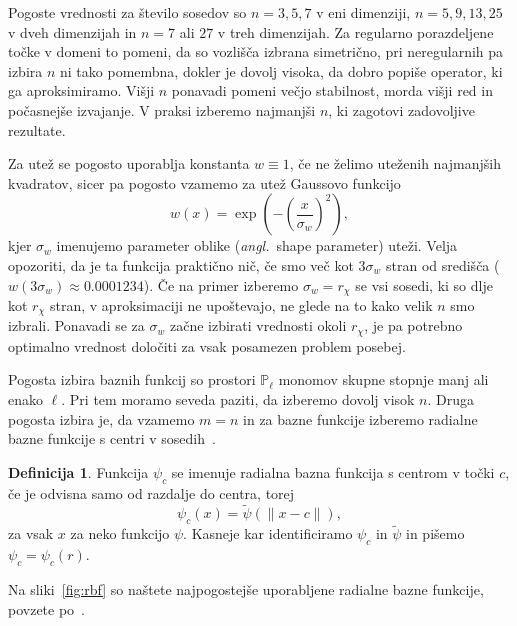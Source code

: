 \documentclass[12pt,a4paper,twoside]{article}
\theoremstyle{definition} %
\newtheorem{definicija}{Definicija}[section]
\theoremstyle{plain} %
\numberwithin{equation}{section}
\newcommand{\ang}[1]{(\textit{angl.}\ #1)}
\begin{document}
Pogoste vrednosti za število sosedov so $n = 3, 5, 7$ v eni dimenziji, $n = 5, 9, 13, 25$ v dveh
dimenzijah in $n = 7$ ali $27$ v treh dimenzijah. Za regularno porazdeljene točke v domeni to
pomeni, da so vozlišča izbrana simetrično, pri neregularnih pa izbira $n$ ni tako pomembna, dokler
je dovolj visoka, da dobro popiše operator, ki ga aproksimiramo.  Višji $n$ ponavadi pomeni večjo
stabilnost, morda višji red in počasnejše izvajanje. V praksi izberemo najmanjši $n$, ki zagotovi
zadovoljive rezultate.

Za utež se pogosto uporablja konstanta $w\equiv1$, če ne želimo uteženih
najmanjših kvadratov, sicer pa pogosto vzamemo za utež Gaussovo funkcijo
\begin{equation}
   w(x) = \exp\left(-\left(\frac{x}{\sigma_w}\right)^2 \right),
\end{equation}
kjer $\sigma_w$ imenujemo parameter oblike \ang{shape parameter} uteži.
Velja opozoriti, da je ta funkcija praktično nič, če smo več kot $3\sigma_w$
stran od središča ($w(3\sigma_w) \approx 0.0001234$). Če na primer izberemo
$\sigma_w = r_\chi$ se vsi sosedi, ki so dlje kot $r_\chi$ stran, v
aproksimaciji ne upoštevajo, ne glede na to kako velik $n$ smo izbrali.
Ponavadi se za $\sigma_w$ začne izbirati vrednosti okoli $r_\chi$, je
pa potrebno optimalno vrednost določiti za vsak posamezen problem posebej.

Pogosta izbira baznih funkcij so prostori $\mathbb{P}_\ell$ monomov skupne
stopnje manj ali enako $\ell$. Pri tem moramo seveda paziti, da izberemo dovolj
visok $n$. Druga pogosta izbira je, da vzamemo $m = n$ in za bazne funkcije
izberemo radialne bazne funkcije s centri v sosedih~\cite{kosec2011h}.

\begin{definicija}
  Funkcija $\psi_c$ se imenuje radialna bazna funkcija s centrom v točki
  $c$,
  če je odvisna samo od razdalje do centra, torej \[
    \psi_c(x) = \tilde\psi(\|x - c\|),
  \]
  za vsak $x$ za neko funkcijo $\psi$. Kasneje kar identificiramo $\psi_c$
  in $\tilde\psi$ in pišemo $\psi_c = \psi_c(r)$.
\end{definicija}

Na sliki~\ref{fig:rbf} so naštete najpogostejše uporabljene radialne bazne funkcije, povzete
po~\cite[str.\ 5]{schaback1995error}.
\end{document}
